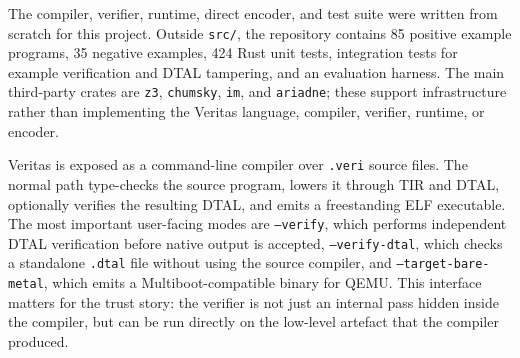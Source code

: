 \noindent The compiler, verifier, runtime, direct encoder, and test suite were written from scratch for this project. Outside \texttt{src/}, the repository contains 85 positive example programs, 35 negative examples, 424 Rust unit tests, integration tests for example verification and DTAL tampering, and an evaluation harness. The main third-party crates are \texttt{z3}, \texttt{chumsky}, \texttt{im}, and \texttt{ariadne}; these support infrastructure rather than implementing the Veritas language, compiler, verifier, runtime, or encoder.

Veritas is exposed as a command-line compiler over \texttt{.veri} source files. The normal path type-checks the source program, lowers it through TIR and DTAL, optionally verifies the resulting DTAL, and emits a freestanding ELF executable. The most important user-facing modes are \texttt{--verify}, which performs independent DTAL verification before native output is accepted, \texttt{--verify-dtal}, which checks a standalone \texttt{.dtal} file without using the source compiler, and \texttt{--target-bare-metal}, which emits a Multiboot-compatible binary for QEMU. This interface matters for the trust story: the verifier is not just an internal pass hidden inside the compiler, but can be run directly on the low-level artefact that the compiler produced.

